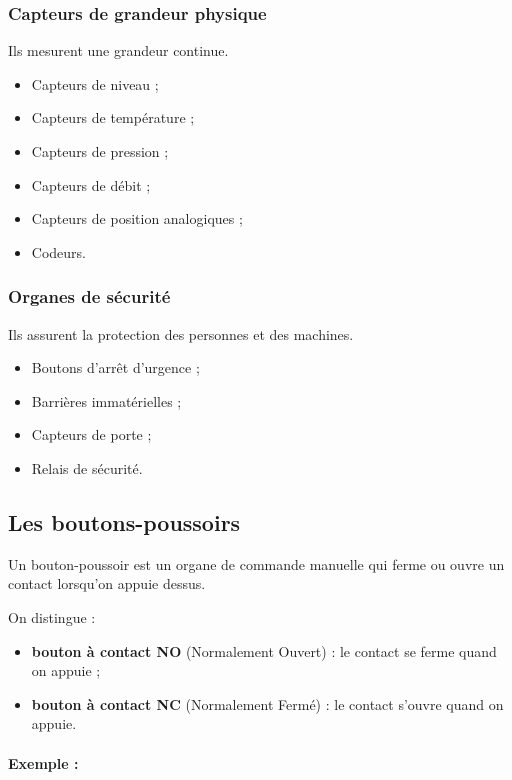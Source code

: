 \subsubsection{Capteurs de grandeur physique}

Ils mesurent une grandeur continue.

\begin{itemize}
    \item Capteurs de niveau ;
    \item Capteurs de température ;
    \item Capteurs de pression ;
    \item Capteurs de débit ;
    \item Capteurs de position analogiques ;
    \item Codeurs.
\end{itemize}

\subsubsection{Organes de sécurité}

Ils assurent la protection des personnes et des machines.

\begin{itemize}
    \item Boutons d'arrêt d'urgence ;
    \item Barrières immatérielles ;
    \item Capteurs de porte ;
    \item Relais de sécurité.
\end{itemize}

\subsection{Les boutons-poussoirs}

Un bouton-poussoir est un organe de commande manuelle qui ferme ou ouvre un contact lorsqu'on appuie dessus.

On distingue :

\begin{itemize}
    \item \textbf{bouton à contact NO} (Normalement Ouvert) : le contact se ferme quand on appuie ;
    \item \textbf{bouton à contact NC} (Normalement Fermé) : le contact s'ouvre quand on appuie.
\end{itemize}

\paragraph{Exemple :}

